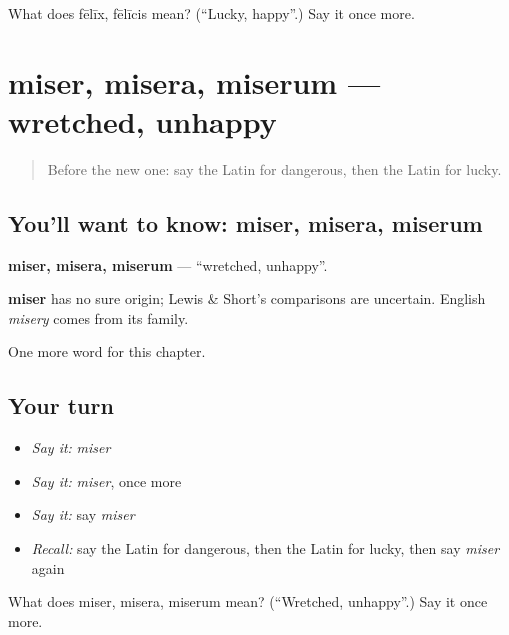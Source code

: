 \begin{tcolorbox}[breakable,colback=teal!4,colframe=teal!35!black,title={Before you move on}]
What does fēlīx, fēlīcis mean? (\textquotedblleft{}Lucky, happy\textquotedblright{}.) Say it once more.
\end{tcolorbox}
\section[miser, misera, miserum]{miser, misera, miserum — wretched, unhappy}

\label{lesson:LA-C148-miser}



\begin{quote}
Before the new one: say the Latin for dangerous, then the Latin for lucky.
\end{quote}

\subsection*{You'll want to know: miser, misera, miserum}
\textbf{miser, misera, miserum} — \textquotedblleft{}wretched, unhappy\textquotedblright{}.

\begin{cousinweb}
\textbf{miser} has no sure origin; Lewis \& Short's comparisons are uncertain. English \emph{misery} comes from its family.
\end{cousinweb}

\begin{grammarlens}[title={What you've built}]
One more word for this chapter.
\end{grammarlens}

\subsection*{Your turn}
\begin{itemize}
\raggedright
  \item \emph{Say it:} \emph{miser}
  \item \emph{Say it:} \emph{miser}, once more
  \item \emph{Say it:} say \emph{miser}
  \item \emph{Recall:} say the Latin for dangerous, then the Latin for lucky, then say \emph{miser} again
\end{itemize}

\begin{tcolorbox}[breakable,colback=teal!4,colframe=teal!35!black,title={Before you move on}]
What does miser, misera, miserum mean? (\textquotedblleft{}Wretched, unhappy\textquotedblright{}.) Say it once more.
\end{tcolorbox}

